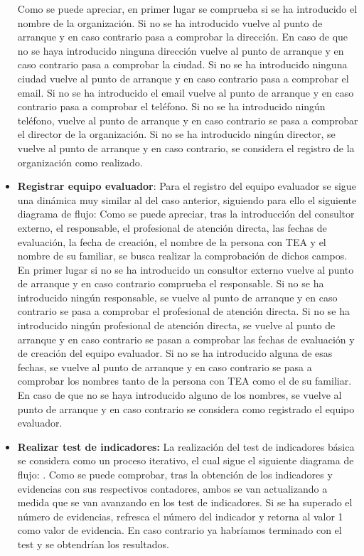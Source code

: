 \begin{itemize}
    Como se puede apreciar, en primer lugar se comprueba si se ha introducido el
    nombre de la organización. Si no se ha introducido vuelve al punto de
    arranque y en caso contrario pasa a comprobar la dirección. En caso de que
    no se haya introducido ninguna dirección vuelve al punto de arranque y en
    caso contrario pasa a comprobar la ciudad. Si no se ha introducido ninguna ciudad
    vuelve al punto de arranque y en caso contrario pasa a comprobar el email.
    Si no se ha introducido el email vuelve al punto de arranque y en caso
    contrario pasa a comprobar el teléfono. Si no se ha introducido ningún
    teléfono, vuelve al punto de arranque y en caso contrario se pasa a
    comprobar el director de la organización. Si no se ha introducido ningún
    director, se vuelve al punto de arranque y en caso contrario, se considera
    el registro de la organización como realizado.
    \item \textbf{Registrar equipo evaluador}: Para el registro del equipo evaluador se sigue una dinámica muy similar al del caso anterior, siguiendo para ello el siguiente diagrama de flujo:
    Como se puede apreciar, tras la introducción del consultor externo, el
    responsable, el profesional de atención directa, las fechas de evaluación,
    la fecha de creación, el nombre de la persona con TEA y el nombre de su
    familiar, se busca realizar la comprobación de dichos campos. En primer
    lugar si no se ha introducido un consultor externo vuelve al punto de
    arranque y en caso contrario comprueba el responsable. Si no se ha
    introducido ningún responsable, se vuelve al punto de arranque y en caso
    contrario se pasa a comprobar el profesional de atención directa. Si no se
    ha introducido ningún profesional de atención directa, se vuelve al punto de
    arranque y en caso contrario se pasan a comprobar las fechas de evaluación y
    de creación del equipo evaluador. Si no se ha introducido alguna de esas
    fechas, se vuelve al punto de arranque y en caso contrario se pasa a
    comprobar los nombres tanto de la persona con TEA como el de su familiar. En
    caso de que no se haya introducido alguno de los nombres, se vuelve al punto
    de arranque y en caso contrario se considera como registrado el equipo
    evaluador.
    \item \textbf{Realizar test de indicadores: }La realización del test de indicadores básica se considera como un proceso iterativo, el cual sigue el siguiente diagrama de flujo:
    .
    Como se puede comprobar, tras la obtención de los indicadores y evidencias con sus respectivos contadores, ambos se van actualizando a medida que se van avanzando en los test de indicadores. Si se ha superado el número de evidencias, refresca el número del indicador y retorna al valor 1 como valor de evidencia. En caso contrario ya habríamos terminado con el test y se obtendrían los resultados.

\end{itemize}
